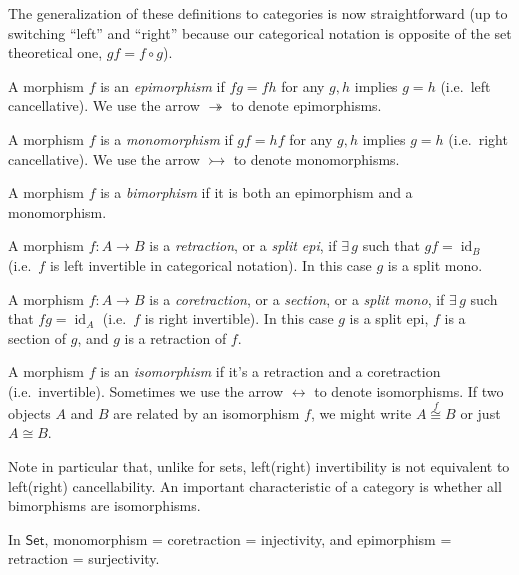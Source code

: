 \documentclass[english,letterpaper]{article}%
\numberwithin{equation}{section}
\numberwithin{figure}{section}
\numberwithin{table}{section}
\theoremstyle{definition}
\theoremstyle{definition}
\theoremstyle{definition}
\theoremstyle{plain}
\theoremstyle{plain}
\theoremstyle{plain}
\theoremstyle{plain}
\theoremstyle{remark}
\theoremstyle{remark}
\DeclareMathOperator{\id}{id}
\begin{document}
The generalization of these definitions to categories is now straightforward
(up to switching ``left'' and ``right'' because our categorical
notation is opposite of the set theoretical one, $gf=f\circ g$).
\begin{defn}[Epimorphism]
A morphism $f$ is an \emph{epimorphism} if $fg=fh$ for any $g,h$
implies $g=h$ (i.e.\ left cancellative). We use the arrow $\twoheadrightarrow$ to denote epimorphisms.
\end{defn}
%
\begin{defn}[Monomorphism]
A morphism $f$ is a \emph{monomorphism} if $gf=hf$ for any $g,h$
implies $g=h$ (i.e.\ right cancellative). We use the arrow $\rightarrowtail$ to denote monomorphisms.
\end{defn}
%
\begin{defn}[Bimorphism]
A morphism $f$ is a \emph{bimorphism} if it is both an epimorphism
and a monomorphism.
\end{defn}
%
\begin{defn}
A morphism $f:A\rightarrow B$ is a \emph{retraction}, or a\emph{
split epi}, if $\exists\,g$ such that $gf=\id_{B}$ (i.e.\ $f$ is
left invertible in categorical notation). In this case $g$ is a split
mono.
\end{defn}
%
\begin{defn}
A morphism $f:A\rightarrow B$ is a \emph{coretraction}, or a \emph{section},
or a \emph{split mono}, if $\exists\,g$ such that $fg=\id_{A}$
(i.e.\ $f$ is right invertible). In this case $g$ is a split epi, $f$ is a section of $g$, and $g$ is a retraction of $f$.
\end{defn}
%
\begin{defn}[Isomorphism]
A morphism $f$ is an \emph{isomorphism} if it's a retraction and
a coretraction (i.e.\ invertible). Sometimes we use the arrow $\leftrightarrow$ to denote isomorphisms. If two objects $A$ and $B$ are related by an isomorphism $f$, we might write $A\overset f\cong B$ or just $A\cong B$.
\end{defn}
Note in particular that, unlike for sets, left(right) invertibility
is not equivalent to left(right) cancellability. An important characteristic
of a category is whether all bimorphisms are isomorphisms.
\begin{prop}
In $\mathsf{Set}$, monomorphism = coretraction = injectivity, and
epimorphism = retraction = surjectivity.
\end{prop}
\end{document}

